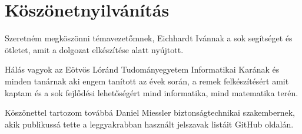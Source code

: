 \chapter{Köszönetnyilvánítás}

Szeretném megköszönni témavezetőmnek, Eichhardt Ivánnak a sok segítséget és ötletet, amit a dolgozat elkészítése alatt nyújtott.

Hálás vagyok az Eötvös Lóránd Tudományegyetem Informatikai Karának és minden tanárnak aki engem tanított az évek során, a remek felkészítésért amit kaptam és a sok fejlődési lehetőségért mind informatika, mind matematika terén.

Köszönettel tartozom továbbá Daniel Miessler biztonságtechnikai szakembernek, akik publikussá tette a leggyakrabban használt jelszavak listáit GitHub oldalán.